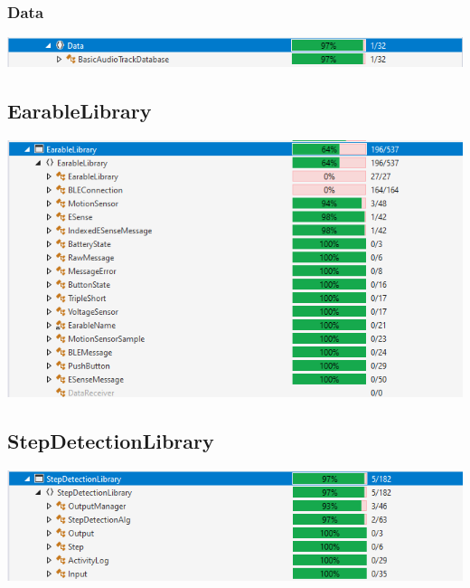 \documentclass[../validierung.tex]{subfiles}
\begin{document}
			\subsubsection{Data}
				\includegraphics[width=\textwidth]{data.png}
	\subsection{EarableLibrary}
		\includegraphics[width=\textwidth]{ear.png}
	\subsection{StepDetectionLibrary}
		\includegraphics[width=\textwidth]{step.png}
\end{document}
